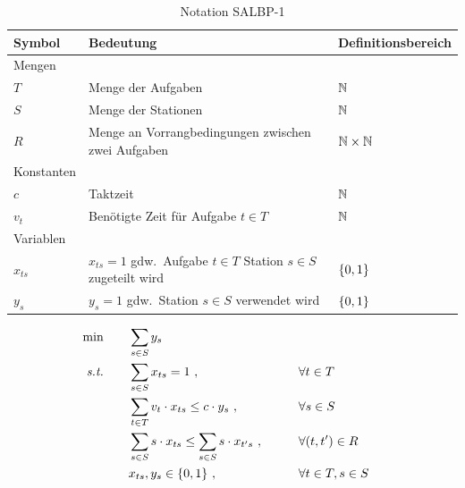 \begin{table}[H]
    \begin{tabularx}{\textwidth}{  l | X | l }
    Symbol & Bedeutung & Definitionsbereich \\\hline\hline
    Mengen & & \\\hline\hline
    $T$ & Menge der Aufgaben & $\mathbb{N}$\\\hline
    $S$ & Menge der Stationen & $\mathbb{N}$\\\hline
    $R$ & Menge an Vorrangbedingungen zwischen zwei Aufgaben & $\mathbb{N}\times\mathbb{N}$\\\hline\hline
    Konstanten &  &  \\\hline\hline
    $c$ & Taktzeit & $\mathbb{N}$\\\hline
    $v_t$ & Benötigte Zeit für Aufgabe $t\in T$ & $\mathbb{N}$\\\hline\hline
    Variablen &  &  \\\hline\hline
    $x_{ts}$ & $x_{ts}=1$ gdw.\ Aufgabe $t\in T$ Station $s\in S$ zugeteilt wird & $\{0,1\}$\\\hline
    $y_s$ & $y_s=1$ gdw.\ Station $s\in S$ verwendet wird & $\{0,1\}$\\\hline
    \end{tabularx}
    \caption{Notation SALBP-1}\label{tab:notification}
\end{table}

\begin{align}
    \min \qquad& \sum_{s\in S} y_{s} \label{eq:minimize_stations}\\
    \textit{s.t.} \qquad
    & \sum_{s\in S} x_{ts} = 1~, \qquad &&\forall t\in T \label{eq:one_station_per_task} \\
    & \sum_{t\in T} v_{t} \cdot x_{ts} \leq c \cdot y_s~, \qquad &&\forall s\in S \label{eq:cycle_time_per_station}\\
    & \sum_{s\in S} s \cdot x_{ts} \leq \sum_{s\in S} s \cdot x_{t's}~, \qquad &&\forall (t,t')\in R \label{eq:preceding_tasks}\\
    & x_{ts}, y_s \in \{0,1\}~, \qquad &&\forall t\in T, s\in S
\end{align}

